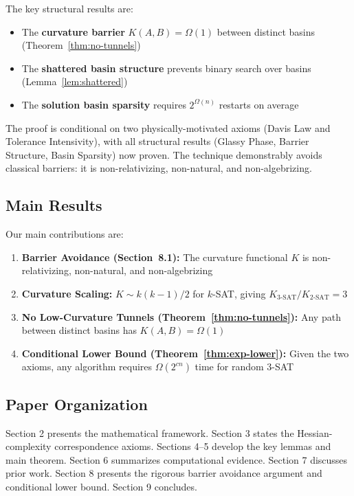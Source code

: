 \documentclass[11pt,a4paper]{article}
\theoremstyle{plain}
\theoremstyle{definition}
\theoremstyle{remark}
\begin{document}
The key structural results are:
\begin{itemize}
    \item The \textbf{curvature barrier} $K(A,B) = \Omega(1)$ between distinct basins (Theorem~\ref{thm:no-tunnels})
    \item The \textbf{shattered basin structure} prevents binary search over basins (Lemma~\ref{lem:shattered})
    \item The \textbf{solution basin sparsity} requires $2^{\Omega(n)}$ restarts on average
\end{itemize}

The proof is conditional on two physically-motivated axioms (Davis Law and Tolerance Intensivity), with all structural results (Glassy Phase, Barrier Structure, Basin Sparsity) now proven. The technique demonstrably avoids classical barriers: it is non-relativizing, non-natural, and non-algebrizing.

\subsection{Main Results}

Our main contributions are:

\begin{enumerate}
    \item \textbf{Barrier Avoidance (Section~8.1):} The curvature functional $K$ is non-relativizing, non-natural, and non-algebrizing
    
    \item \textbf{Curvature Scaling:} $K \sim k(k-1)/2$ for $k$-SAT, giving $K_{\text{3-SAT}}/K_{\text{2-SAT}} = 3$
    
    \item \textbf{No Low-Curvature Tunnels (Theorem~\ref{thm:no-tunnels}):} Any path between distinct basins has $K(A,B) = \Omega(1)$
    
    \item \textbf{Conditional Lower Bound (Theorem~\ref{thm:exp-lower}):} Given the two axioms, any algorithm requires $\Omega(2^{cn})$ time for random 3-SAT
\end{enumerate}

\subsection{Paper Organization}

Section 2 presents the mathematical framework. Section 3 states the Hessian-complexity correspondence axioms. Sections 4--5 develop the key lemmas and main theorem. Section 6 summarizes computational evidence. Section 7 discusses prior work. Section 8 presents the rigorous barrier avoidance argument and conditional lower bound. Section 9 concludes.
\end{document}
